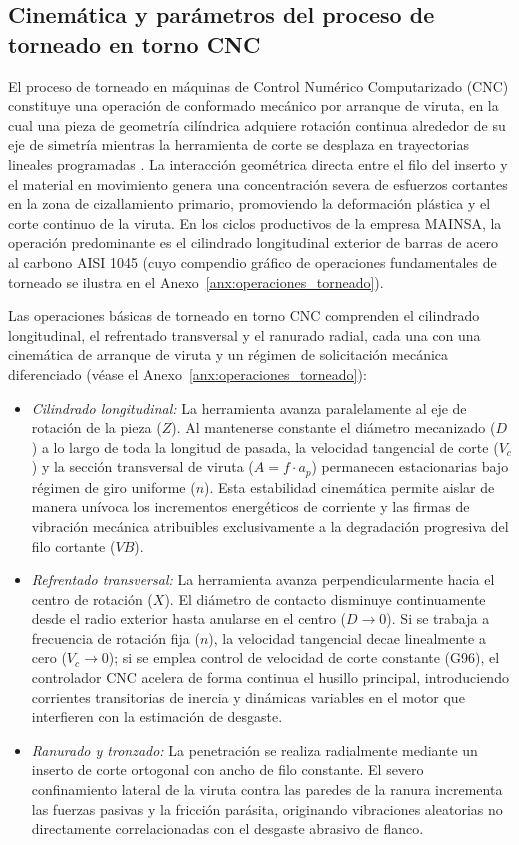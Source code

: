 \subsection{Cinemática y parámetros del proceso de torneado en torno CNC}
\label{subsec:cinematica_torneado}

El proceso de torneado en máquinas de Control Numérico Computarizado (CNC) constituye una operación de conformado mecánico por arranque de viruta, en la cual una pieza de geometría cilíndrica adquiere rotación continua alrededor de su eje de simetría mientras la herramienta de corte se desplaza en trayectorias lineales programadas \citep{groover2010}. La interacción geométrica directa entre el filo del inserto y el material en movimiento genera una concentración severa de esfuerzos cortantes en la zona de cizallamiento primario, promoviendo la deformación plástica y el corte continuo de la viruta. En los ciclos productivos de la empresa MAINSA, la operación predominante es el cilindrado longitudinal exterior de barras de acero al carbono AISI 1045 (cuyo compendio gráfico de operaciones fundamentales de torneado se ilustra en el Anexo~\ref{anx:operaciones_torneado}).

Las operaciones básicas de torneado en torno CNC comprenden el cilindrado longitudinal, el refrentado transversal y el ranurado radial, cada una con una cinemática de arranque de viruta y un régimen de solicitación mecánica diferenciado (véase el Anexo~\ref{anx:operaciones_torneado}):
\begin{itemize}
    \item \textit{Cilindrado longitudinal:} La herramienta avanza paralelamente al eje de rotación de la pieza ($Z$). Al mantenerse constante el diámetro mecanizado ($D$) a lo largo de toda la longitud de pasada, la velocidad tangencial de corte ($V_c$) y la sección transversal de viruta ($A = f \cdot a_p$) permanecen estacionarias bajo régimen de giro uniforme ($n$). Esta estabilidad cinemática permite aislar de manera unívoca los incrementos energéticos de corriente y las firmas de vibración mecánica atribuibles exclusivamente a la degradación progresiva del filo cortante ($VB$).
    \item \textit{Refrentado transversal:} La herramienta avanza perpendicularmente hacia el centro de rotación ($X$). El diámetro de contacto disminuye continuamente desde el radio exterior hasta anularse en el centro ($D \to 0$). Si se trabaja a frecuencia de rotación fija ($n$), la velocidad tangencial decae linealmente a cero ($V_c \to 0$); si se emplea control de velocidad de corte constante (G96), el controlador CNC acelera de forma continua el husillo principal, introduciendo corrientes transitorias de inercia y dinámicas variables en el motor que interfieren con la estimación de desgaste.
    \item \textit{Ranurado y tronzado:} La penetración se realiza radialmente mediante un inserto de corte ortogonal con ancho de filo constante. El severo confinamiento lateral de la viruta contra las paredes de la ranura incrementa las fuerzas pasivas y la fricción parásita, originando vibraciones aleatorias no directamente correlacionadas con el desgaste abrasivo de flanco.
\end{itemize}

